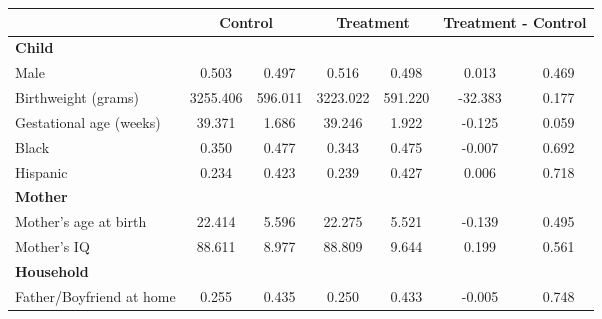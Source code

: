 \begin{tabular}{lcccccc}
\toprule
& \multicolumn{2}{c}{Control} & \multicolumn{2}{c}{Treatment} & \multicolumn{2}{c}{Treatment - Control} \\
\midrule
\textbf{Child} & & & & & & \\
\quad\quad Male & 0.503 & 0.497 & 0.516 & 0.498 & 0.013 & 0.469 \\
\quad\quad Birthweight (grams) & 3255.406 & 596.011 & 3223.022 & 591.220 & -32.383 & 0.177 \\
\quad\quad Gestational age (weeks) & 39.371 & 1.686 & 39.246 & 1.922 & -0.125 & 0.059 \\
\quad\quad Black & 0.350 & 0.477 & 0.343 & 0.475 & -0.007 & 0.692 \\
\quad\quad Hispanic & 0.234 & 0.423 & 0.239 & 0.427 & 0.006 & 0.718 \\
\textbf{Mother} & & & & & & \\
\quad\quad Mother's age at birth & 22.414 & 5.596 & 22.275 & 5.521 & -0.139 & 0.495 \\
\quad\quad Mother's IQ & 88.611 & 8.977 & 88.809 & 9.644 & 0.199 & 0.561 \\
\textbf{Household} & & & & & & \\
\quad\quad Father/Boyfriend at home & 0.255 & 0.435 & 0.250 & 0.433 & -0.005 & 0.748 \\
\bottomrule
\end{tabular}
